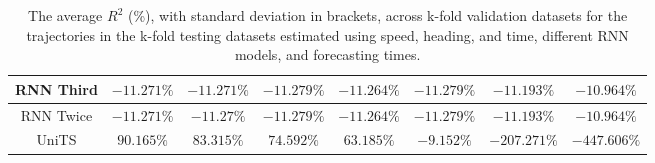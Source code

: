 \begin{table}[!ht]
{\begin{tabular}{|c|c|c|c|c|c|c|c|}
			RNN Third & $-11.271\%$ & $-11.271\%$ & $-11.279\%$ & $-11.264\%$ & $-11.279\%$ & $-11.193\%$ & $-10.964\%$ \\ \hline
			RNN Twice & $-11.271\%$ & $-11.27\%$ & $-11.279\%$ & $-11.264\%$ & $-11.279\%$ & $-11.193\%$ & $-10.964\%$ \\ \hline
			UniTS & $90.165\%$ & $83.315\%$ & $74.592\%$ & $63.185\%$ & $-9.152\%$ & $-207.271\%$ & $-447.606\%$ \\ \hline
		\end{tabular}
	}
	\caption{The average $R^{2}$ (\%), with standard deviation in brackets, across k-fold validation datasets for the trajectories in the k-fold testing datasets estimated using speed, heading, and time, different RNN models, and forecasting times.}
	\label{tab:all_speed_actual_dir_R2}
\end{table}